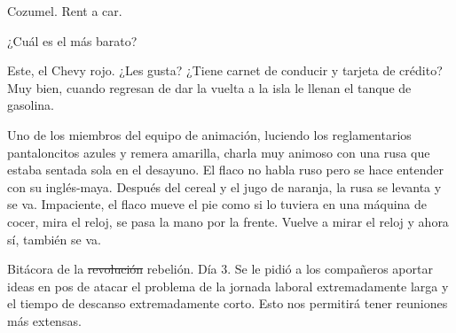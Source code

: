 \documentclass[12pt,twoside,openright,a5paper]{book}
\begin{document}
\vspace{0.5cm}
\hrulefill\hspace{0.2cm} \decofourleft\decofourright \hspace{0.2cm} \hrulefill
\vspace{0.5cm}

Cozumel. Rent a car.

¿Cuál es el más barato?

Este, el Chevy rojo. ¿Les gusta? ¿Tiene carnet de conducir y tarjeta de
crédito? Muy bien, cuando regresan de dar la vuelta a la isla le llenan
el tanque de gasolina.

\afterpage{}
\vspace{0.5cm}
\hrulefill\hspace{0.2cm} \decofourleft\decofourright \hspace{0.2cm} \hrulefill
\vspace{0.5cm}

Uno de los miembros del equipo de animación, luciendo los reglamentarios
pantaloncitos azules y remera amarilla, charla muy animoso con una rusa que
estaba sentada sola en el desayuno. El flaco no habla ruso pero se hace
entender con su inglés-maya. Después del cereal y el jugo de naranja,
la rusa se levanta y se va. Impaciente, el flaco mueve el pie como si lo
tuviera en una máquina de cocer, mira el reloj, se pasa la mano por la
frente. Vuelve a mirar el reloj y ahora sí, también se va.


\vspace{0.5cm}
\hrulefill\hspace{0.2cm} \decofourleft\decofourright \hspace{0.2cm} \hrulefill
\vspace{0.5cm}

Bitácora de la \st{revolución} rebelión. Día 3. Se le pidió a los compañeros aportar
ideas en pos de atacar el problema de la jornada laboral extremadamente
larga y el tiempo de descanso extremadamente corto. Esto nos permitirá
tener reuniones más extensas.



\vspace{0.5cm}
\hrulefill\hspace{0.2cm} \decofourleft\decofourright \hspace{0.2cm} \hrulefill
\vspace{0.5cm}
\end{document}
